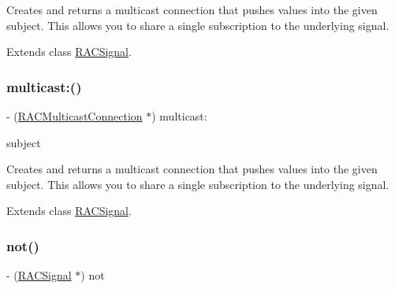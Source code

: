 Creates and returns a multicast connection that pushes values into the given subject. This allows you to share a single subscription to the underlying signal. 

Extends class \mbox{\hyperlink{interface_r_a_c_signal_a55b43f4fbef7e430a4587ce13eab18cb}{R\+A\+C\+Signal}}.

\mbox{\label{category_r_a_c_signal_07_operations_08_a55b43f4fbef7e430a4587ce13eab18cb}} 
\subsubsection{\texorpdfstring{multicast\+:()}{multicast:()}\hspace{0.1cm}{\footnotesize\ttfamily [3/3]}}
{\footnotesize\ttfamily -\/ (\mbox{\hyperlink{interface_r_a_c_multicast_connection}{R\+A\+C\+Multicast\+Connection}} $\ast$) multicast\+: \begin{DoxyParamCaption}\item[{(\mbox{\hyperlink{interface_r_a_c_subject}{R\+A\+C\+Subject}} $\ast$)}]{subject }\end{DoxyParamCaption}}

Creates and returns a multicast connection that pushes values into the given subject. This allows you to share a single subscription to the underlying signal. 

Extends class \mbox{\hyperlink{interface_r_a_c_signal_a55b43f4fbef7e430a4587ce13eab18cb}{R\+A\+C\+Signal}}.

\mbox{\label{category_r_a_c_signal_07_operations_08_a53de1c418b57ee4c60d20f561db04717}} 
\subsubsection{\texorpdfstring{not()}{not()}\hspace{0.1cm}{\footnotesize\ttfamily [1/3]}}
{\footnotesize\ttfamily -\/ (\mbox{\hyperlink{interface_r_a_c_signal}{R\+A\+C\+Signal}} $\ast$) not \begin{DoxyParamCaption}{ }\end{DoxyParamCaption}}

